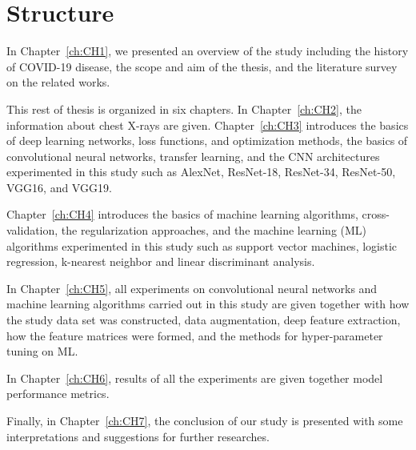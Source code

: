 \begin{landscape}
\begin{table}[]
\begin{tabular}{lllcccc}
\end{tabular}
\end{table}
\end{landscape}

\section{Structure}

In Chapter~\ref{ch:CH1}, we presented an overview of the study including the history of COVID-19 disease, the scope and aim of the thesis, and the literature survey on the related works.

This rest of thesis is organized in six chapters. In Chapter~\ref{ch:CH2}, the information about chest X-rays are given.
Chapter~\ref{ch:CH3} introduces the basics of deep learning networks, loss functions, and optimization methods, the basics of convolutional neural networks, transfer learning, and the CNN architectures experimented in this study such as AlexNet, ResNet-18, ResNet-34, ResNet-50, VGG16, and VGG19.

Chapter~\ref{ch:CH4} introduces the basics of machine learning algorithms, cross-validation, the regularization approaches, and the machine learning (ML) algorithms experimented in this study such as support vector machines, logistic regression, k-nearest neighbor and linear discriminant analysis.

In Chapter~\ref{ch:CH5}, all experiments on convolutional neural networks and machine learning algorithms carried out in this study are given together with how the study data set was constructed, data augmentation, deep feature extraction, how the feature matrices were formed, and the methods for hyper-parameter tuning on ML.

In Chapter~\ref{ch:CH6}, results of all the experiments are given together model performance metrics.

Finally, in Chapter~\ref{ch:CH7}, the conclusion of our study is presented with some interpretations and suggestions for further researches.
